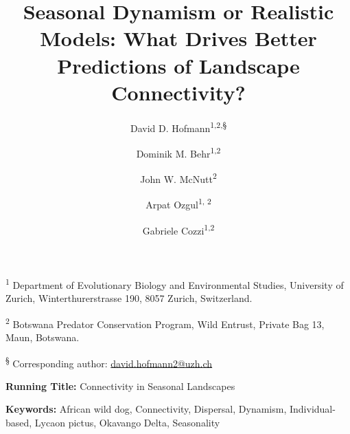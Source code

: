 \documentclass[abstract=on,10pt,a4paper,bibliography=totocnumbered]{article}
\title{Seasonal Dynamism or Realistic Models: What Drives Better Predictions
of Landscape Connectivity?}
\author{
  David D. Hofmann\textsuperscript{1,2,\S} \orcid{0000-0003-3477-4365} \and
  Dominik M. Behr\textsuperscript{1,2} \orcid{0000-0001-7378-8538} \and
  John W. McNutt\textsuperscript{2} \and
  Arpat Ozgul\textsuperscript{1, 2} \orcid{0000-0001-7477-2642} \and
  Gabriele Cozzi\textsuperscript{1,2} \orcid{0000-0002-1744-1940}
}
\begin{document}

\maketitle

\begin{flushleft}

\vspace{0.5cm}

\textsuperscript{1} Department of Evolutionary Biology and Environmental
Studies, University of Zurich, Winterthurerstrasse 190, 8057 Zurich,
Switzerland.

\textsuperscript{2} Botswana Predator Conservation Program, Wild Entrust,
Private Bag 13, Maun, Botswana.

\textsuperscript{\S} Corresponding author: \href{mailto://david.hofmann2@uzh.ch}{david.hofmann2@uzh.ch}

\vspace{4cm}

\textbf{Running Title:} Connectivity in Seasonal Landscapes

\vspace{0.5cm}

\textbf{Keywords:} African wild dog, Connectivity, Dispersal, Dynamism,
Individual-based, Lycaon pictus, Okavango Delta, Seasonality

\end{flushleft}

\end{document}
